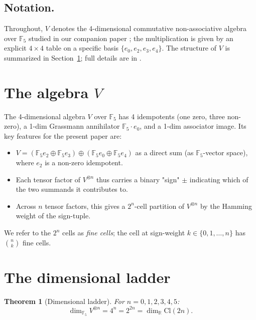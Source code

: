 \documentclass[11pt,reqno]{amsart}
\theoremstyle{plain}
\newtheorem{theorem}{Theorem}[section]
\theoremstyle{definition}
\theoremstyle{remark}
\newcommand{\F}{\mathbb{F}}
\newcommand{\R}{\mathbb{R}}
\newcommand{\Cl}{\mathrm{Cl}}
\begin{document}
\subsection{Notation.}
Throughout, $V$ denotes the 4-dimensional commutative non-associative
algebra over $\F_5$ studied in our companion paper
\cite{SandersGishDiscreteDirac}; the multiplication is given by an
explicit $4 \times 4$ table on a specific basis $\{e_0, e_2, e_3, e_4\}$.
The structure of $V$ is summarized in Section~\ref{sec:V}; full details
are in \cite{SandersGishDiscreteDirac}.

\section{The algebra $V$}
\label{sec:V}

The 4-dimensional algebra $V$ over $\F_5$ has 4 idempotents (one zero,
three non-zero), a 1-dim Grassmann annihilator $\F_5 \cdot e_0$, and a
1-dim associator image. Its key features for the present paper are:
\begin{itemize}
\item $V = (\F_5 e_2 \oplus \F_5 e_3) \oplus (\F_5 e_0 \oplus \F_5 e_4)$
as a direct sum (as $\F_5$-vector space), where $e_2$ is a non-zero
idempotent.
\item Each tensor factor of $V^{\otimes n}$ thus carries a binary
"sign" $\pm$ indicating which of the two summands it contributes to.
\item Across $n$ tensor factors, this gives a $2^n$-cell partition of
$V^{\otimes n}$ by the Hamming weight of the sign-tuple.
\end{itemize}
We refer to the $2^n$ cells as \emph{fine cells}; the cell at
sign-weight $k \in \{0, 1, \ldots, n\}$ has $\binom{n}{k}$ fine cells.

\section{The dimensional ladder}

\begin{theorem}[Dimensional ladder]\label{thm:ladder}
For $n = 0, 1, 2, 3, 4, 5$:
\[
\dim_{\F_5} V^{\otimes n} = 4^n = 2^{2n} = \dim_\R \Cl(2n).
\]
\end{theorem}
\end{document}
